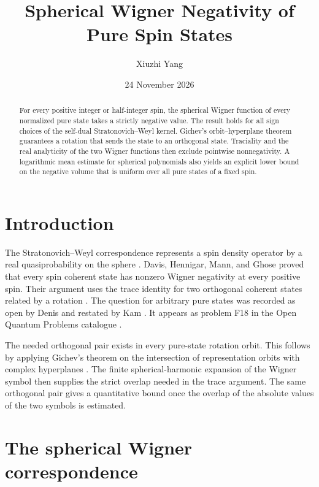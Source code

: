 \documentclass[11pt,a4paper]{article}
\title{\textbf{Spherical Wigner Negativity of Pure Spin States}}
\author{Xiuzhi Yang}
\date{24 November 2026}
\begin{document}
\maketitle

\begin{abstract}
For every positive integer or half-integer spin, the spherical Wigner
function of every normalized pure state takes a strictly negative value.
The result holds for all sign choices of the self-dual
Stratonovich--Weyl kernel. Gichev's orbit--hyperplane theorem guarantees
a rotation that sends the state to an orthogonal state. Traciality and
the real analyticity of the two Wigner functions then exclude
pointwise nonnegativity. A logarithmic mean estimate for spherical
polynomials also yields an explicit lower bound on the negative volume
that is uniform over all pure states of a fixed spin.
\end{abstract}

\section{Introduction}

The Stratonovich--Weyl correspondence represents a spin density operator
by a real quasiprobability on the sphere \cite{varilly1989,davis2021}.
Davis, Hennigar, Mann, and Ghose proved that every spin coherent state
has nonzero Wigner negativity at every positive spin. Their argument
uses the trace identity for two orthogonal coherent states related by a
rotation \cite[Sec.~3]{davis2023}. The question for arbitrary pure states
was recorded as open by Denis \cite[p.~3]{denis2025} and restated by
Kam \cite[Secs.~I and VI]{kam2026}. It appears as problem F18 in the
Open Quantum Problems catalogue \cite{f18}.

The needed orthogonal pair exists in every pure-state rotation orbit.
This follows by applying Gichev's theorem on the intersection of
representation orbits with complex hyperplanes
\cite[Corollary~1]{gichev2004}. The finite spherical-harmonic expansion
of the Wigner symbol then supplies the strict overlap needed in the
trace argument. The same orthogonal pair gives a quantitative bound
once the overlap of the absolute values of the two symbols is estimated.

\section{The spherical Wigner correspondence}
\label{sec:kernel}
\end{document}

